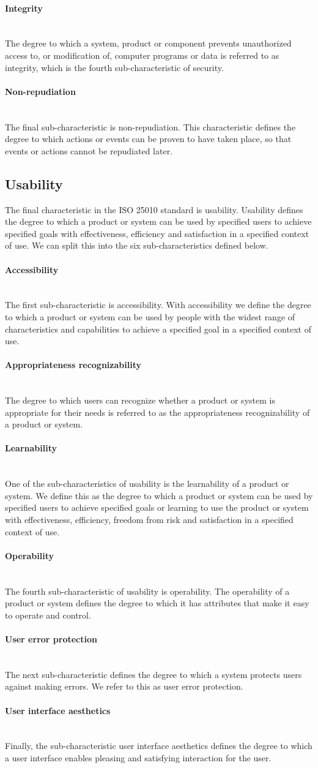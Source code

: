 \documentclass[twoside]{uva-inf-bachelor-thesis}
\newcommand{\myparagraph}[1]{\paragraph{#1}\mbox{}\\}
\begin{document}
\myparagraph{Integrity}
The degree to which a system, product or component prevents unauthorized access to, or modification of, computer programs or data is referred to as integrity, which is the fourth sub-characteristic of security.

\myparagraph{Non-repudiation}
The final sub-characteristic is non-repudiation. This characteristic defines the degree to which actions or events can be proven to have taken place, so that events or actions cannot be repudiated later.

\subsection{Usability}
The final characteristic in the ISO 25010 standard is usability. Usability defines the degree to which a product or system can be used by specified users to achieve specified goals with effectiveness, efficiency and satisfaction in a specified context of use. We can split this into the six sub-characteristics defined below.

\myparagraph{Accessibility}
The first sub-characteristic is accessibility. With accessibility we define the degree to which a product or system can be used by people with the widest range of characteristics and capabilities to achieve a specified goal in a specified context of use.

\myparagraph{Appropriateness recognizability}
The degree to which users can recognize whether a product or system is appropriate for their needs is referred to as the appropriateness recognizability of a product or system.

\myparagraph{Learnability}
One of the sub-characteristics of usability is the learnability of a product or system. We define this as the degree to which a product or system can be used by specified users to achieve specified goals or learning to use the product or system with effectiveness, efficiency, freedom from risk and satisfaction in a specified context of use.

\myparagraph{Operability}
The fourth sub-characteristic of usability is operability. The operability of a product or system defines the degree to which it has attributes that make it easy to operate and control.

\myparagraph{User error protection}
The next sub-characteristic defines the degree to which a system protects users against making errors. We refer to this as user error protection.

\myparagraph{User interface aesthetics}
Finally, the sub-characteristic user interface aesthetics defines the degree to which a user interface enables pleasing and satisfying interaction for the user.
\end{document}
